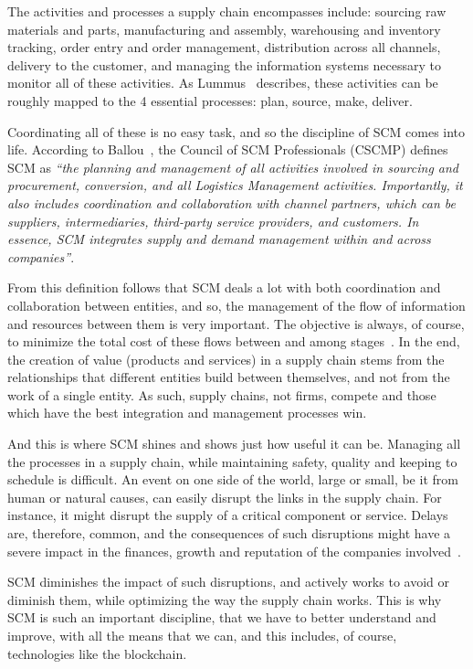   The activities and processes a supply chain encompasses include: sourcing raw materials and parts, manufacturing and assembly, warehousing and inventory tracking, order entry and order management, distribution across all channels, delivery to the customer, and managing the information systems necessary to monitor all of these activities. As Lummus~\cite{Lummus2014} describes, these activities can be roughly mapped to the 4 essential processes: plan, source, make, deliver.
    
  Coordinating all of these is no easy task, and so the discipline of SCM comes into life. According to Ballou~\cite{Ballou2007}, the Council of SCM Professionals (CSCMP) defines SCM as \textit{“the planning and management of all activities involved in sourcing and procurement, conversion, and all Logistics Management activities. Importantly, it also includes coordination and collaboration with channel partners, which can be suppliers, intermediaries, third-party service providers, and customers. In essence, SCM integrates supply and demand management within and across companies”}.

From this definition follows that SCM deals a lot with both coordination and collaboration between entities, and so, the management of the flow of information and resources between them is very important. The objective is always, of course, to minimize the total cost of these flows between and among stages~\cite{Habib2011}.
In the end, the creation of value (products and services) in a supply chain stems from the relationships that different entities build between themselves, and not from the work of a single entity. As such, supply chains, not firms, compete and those which have the best integration and management processes win.

And this is where SCM shines and shows just how useful it can be. Managing all the processes in a supply chain, while maintaining safety, quality and keeping to schedule is difficult. An event on one side of the world, large or small, be it from human or natural causes, can easily disrupt the links in the supply chain. For instance, it might disrupt the supply of a critical component or service. Delays are, therefore, common, and the consequences of such disruptions might have a severe impact in the finances, growth and reputation of the companies involved~\cite{Punter2013}.

SCM diminishes the impact of such disruptions, and actively works to avoid or diminish them, while optimizing the way the supply chain works. This is why SCM is such an important discipline, that we have to better understand and improve, with all the means that we can, and this includes, of course, technologies like the blockchain.

